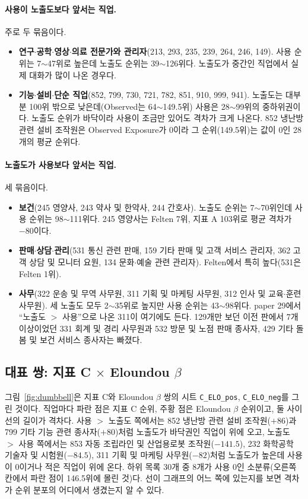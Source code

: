 \documentclass[11pt]{article}
\begin{document}
\paragraph{사용이 노출도보다 앞서는 직업.} 주로 두 묶음이다.
\begin{itemize}[leftmargin=*]
  \item \textbf{연구$\cdot$공학$\cdot$영상$\cdot$의료 전문가와 관리자}(213, 293, 235, 239, 264, 246, 149). 사용 순위는 7$\sim$47위로 높은데 노출도 순위는 39$\sim$126위다. 노출도가 중간인 직업에서 실제 대화가 많이 나온 경우다.
  \item \textbf{기능$\cdot$설비$\cdot$단순 직업}(852, 799, 730, 721, 782, 851, 910, 999, 941). 노출도는 대부분 100위 밖으로 낮은데(Observed는 64$\sim$149.5위) 사용은 28$\sim$99위의 중하위권이다. 노출도 순위가 바닥이라 사용이 조금만 있어도 격차가 크게 나온다. 852 냉난방 관련 설비 조작원은 Observed Exposure가 0이라 그 순위(149.5위)는 값이 0인 28개의 평균 순위다.
\end{itemize}

\paragraph{노출도가 사용보다 앞서는 직업.} 세 묶음이다.
\begin{itemize}[leftmargin=*]
  \item \textbf{보건}(245 영양사, 243 약사 및 한약사, 244 간호사). 노출도 순위는 7$\sim$70위인데 사용 순위는 98$\sim$111위다. 245 영양사는 Felten 7위, 지표 A 103위로 평균 격차가 $-80$이다.
  \item \textbf{판매$\cdot$상담$\cdot$관리}(531 통신 관련 판매, 159 기타 판매 및 고객 서비스 관리자, 362 고객 상담 및 모니터 요원, 134 문화$\cdot$예술 관련 관리자). Felten에서 특히 높다(531은 Felten 1위).
  \item \textbf{사무}(322 운송 및 무역 사무원, 311 기획 및 마케팅 사무원, 312 인사 및 교육$\cdot$훈련 사무원). 세 노출도 모두 2$\sim$35위로 높지만 사용 순위는 43$\sim$98위다. paper 29에서 ``노출도 $>$ 사용''으로 나온 311이 여기에도 든다. 129개만 보던 이전 판에서 7개 이상이었던 331 회계 및 경리 사무원과 532 방문 및 노점 판매 종사자, 429 기타 돌봄 및 보건 서비스 종사자는 빠졌다.
\end{itemize}

\subsection{대표 쌍: 지표 C $\times$ Eloundou $\beta$}

그림~\ref{fig:dumbbell}은 지표 C와 Eloundou $\beta$ 쌍의 시트 \texttt{C\_ELO\_pos}, \texttt{C\_ELO\_neg}를 그린 것이다. 직업마다 파란 점은 지표 C 순위, 주황 점은 Eloundou $\beta$ 순위이고, 둘 사이 선의 길이가 격차다. 사용 $>$ 노출도 쪽에서는 852 냉난방 관련 설비 조작원($+86$)과 799 기타 기능 관련 종사자($+80$)처럼 노출도가 바닥권인 직업이 위에 오고, 노출도 $>$ 사용 쪽에서는 853 자동 조립라인 및 산업용로봇 조작원($-141.5$), 232 화학공학 기술자 및 시험원($-84.5$), 311 기획 및 마케팅 사무원($-82$)처럼 노출도가 높은데 사용이 0이거나 적은 직업이 위에 온다. 하위 목록 30개 중 8개가 사용 0인 소분류(오른쪽 칸에서 파란 점이 146.5위에 몰린 것)다. 선이 그래프의 어느 쪽에 있는지를 보면 격차가 순위 분포의 어디에서 생겼는지 알 수 있다.
\end{document}
